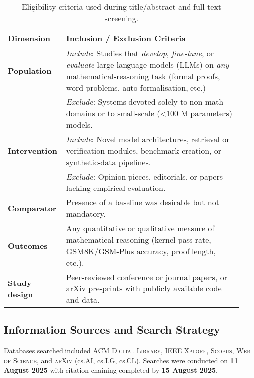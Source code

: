 \documentclass[acmsmall,anonymous]{acmart}
\begin{document}
\begin{table}[htbp]
  \centering
  \caption{Eligibility criteria used during title/abstract and full-text screening.}
  \label{tab:eligibility}
  \begin{tabular}{@{}p{0.21\linewidth}p{0.73\linewidth}@{}}
    \toprule
    \textbf{Dimension} & \textbf{Inclusion / Exclusion Criteria}\\
    \midrule
    \textbf{Population} &
      \emph{Include}: Studies that \textit{develop}, \textit{fine-tune}, or
      \textit{evaluate} large language models (LLMs) on \emph{any} mathematical-reasoning task
      (formal proofs, word problems, auto-formalisation, etc.)\\
      & \emph{Exclude}: Systems devoted solely to non-math domains or to
      small-scale (<100 M parameters) models.\\[4pt]
    \textbf{Intervention} &
      \emph{Include}: Novel model architectures, retrieval or verification
      modules, benchmark creation, or synthetic-data pipelines.\\
      & \emph{Exclude}: Opinion pieces, editorials, or papers lacking empirical
      evaluation.\\[4pt]
    \textbf{Comparator} &
      Presence of a baseline was desirable but not mandatory.\\[4pt]
    \textbf{Outcomes} &
      Any quantitative or qualitative measure of mathematical reasoning
      (kernel pass-rate, GSM8K/GSM-Plus accuracy, proof length, etc.).\\[4pt]
    \textbf{Study design} &
      Peer-reviewed conference or journal papers, or arXiv pre-prints with
      publicly available code and data.\\
    \bottomrule
  \end{tabular}
\end{table}

\subsection{Information Sources and Search Strategy}
Databases searched included \textsc{ACM Digital Library}, \textsc{IEEE Xplore},
\textsc{Scopus}, \textsc{Web of Science}, and \textsc{arXiv}
(cs.AI, cs.LG, cs.CL). Searches were conducted on \textbf{11 August 2025} with citation chaining completed by \textbf{15 August 2025}.
\end{document}
